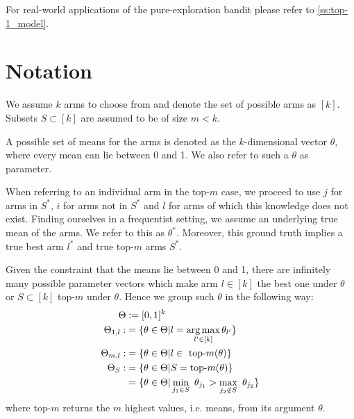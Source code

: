 For real-world applications of the pure-exploration bandit please refer to
\ref{ss:top-1_model}.

\section{Notation}\label{section:notation}
We assume $k$ arms to choose from and denote the set of possible arms as $[k]$.
Subsets $S \subset [k]$ are assumed to be of size $m < k$.

A possible set of means for the arms is denoted as the $k$-dimensional vector
$\theta$, where every mean can lie between 0 and 1. We also refer to such a
$\theta$ as parameter.

When referring to an individual arm in the top-$m$ case, we proceed to use $j$
for arms in $S^*$, $i$ for arms not in $S^*$ and $l$ for arms of which this
knowledge does not exist. Finding ourselves in a frequentist setting, we assume
an underlying true mean of the arms. We refer to this as $\theta^*$. Moreover,
this ground truth implies a true best arm $l^*$ and true top-$m$ arms $S^*$.

Given the constraint that the means lie between 0 and 1, there are infinitely
many possible parameter vectors which make arm $l \in [k]$ the best one under
$\theta$ or $S \subset [k]$ top-$m$ under $\theta$. Hence we group such $\theta$
in the following way:
\begin{align}
  \Theta &:= [0, 1]^k \\
  \Theta_{1, l} :&= \{\theta \in \Theta | l = \operatorname*{arg\,max}_{l' \in [k]}
      \theta_{l'}\} \\
  \Theta_{m, l} :&= \{\theta \in \Theta | l \in \text{ top-}m(\theta)\} \\
  \Theta_S :&= \{\theta \in \Theta | S = \text{top-}m(\theta)\} \\
    &= \{ \theta \in \Theta| \min_{j_1 \in S}\ \theta_{j_1} > \max_{j_2 \notin
      S}\ \theta_{j_2}\}
\end{align}
where top-$m$ returns the $m$ highest values, i.e. means, from its argument
$\theta$.

